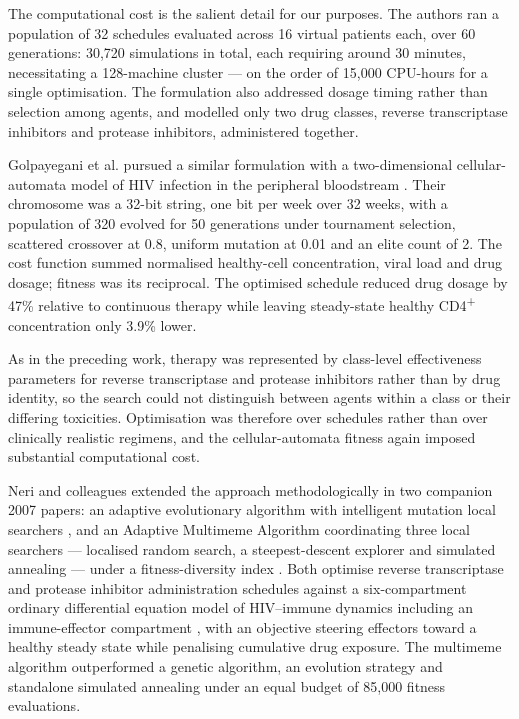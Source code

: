 \documentclass[conference]{IEEEtran}
\begin{document}
The computational cost is the salient detail for our purposes. The authors ran a population of 32 schedules evaluated across 16 virtual patients each, over 60 generations: 30,720 simulations in total, each requiring around 30 minutes, necessitating a 128-machine cluster --- on the order of 15,000 CPU-hours for a single optimisation. The formulation also addressed dosage timing rather than selection among agents, and modelled only two drug classes, reverse transcriptase inhibitors and protease inhibitors, administered together.

Golpayegani et al. pursued a similar formulation with a two-dimensional cellular-automata model of HIV infection in the peripheral bloodstream \cite{golpayegani2017}. Their chromosome was a 32-bit string, one bit per week over 32 weeks, with a population of 320 evolved for 50 generations under tournament selection, scattered crossover at 0.8, uniform mutation at 0.01 and an elite count of 2. The cost function summed normalised healthy-cell concentration, viral load and drug dosage; fitness was its reciprocal. The optimised schedule reduced drug dosage by 47\% relative to continuous therapy while leaving steady-state healthy CD4\textsuperscript{+} concentration only 3.9\% lower.

As in the preceding work, therapy was represented by class-level effectiveness parameters for reverse transcriptase and protease inhibitors rather than by drug identity, so the search could not distinguish between agents within a class or their differing toxicities. Optimisation was therefore over schedules rather than over clinically realistic regimens, and the cellular-automata fitness again imposed substantial computational cost.

Neri and colleagues extended the approach methodologically in two companion 2007 papers: an adaptive evolutionary algorithm with intelligent mutation local searchers \cite{neri2007appl}, and an Adaptive Multimeme Algorithm coordinating three local searchers --- localised random search, a steepest-descent explorer and simulated annealing --- under a fitness-diversity index \cite{neri2007tcbb}. Both optimise reverse transcriptase and protease inhibitor administration schedules against a six-compartment ordinary differential equation model of HIV--immune dynamics including an immune-effector compartment \cite{adams2005}, with an objective steering effectors toward a healthy steady state while penalising cumulative drug exposure. The multimeme algorithm outperformed a genetic algorithm, an evolution strategy and standalone simulated annealing under an equal budget of 85,000 fitness evaluations.
\end{document}
